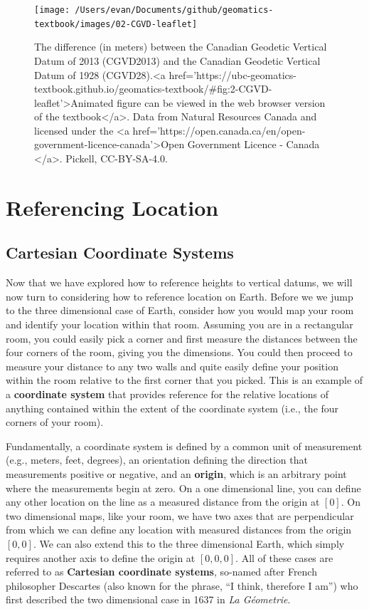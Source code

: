 \documentclass[
]{book}
\begin{document}
\begin{figure}
\texttt{[image: /Users/evan/Documents/github/geomatics-textbook/images/02-CGVD-leaflet]} \caption{The difference (in meters) between the Canadian Geodetic Vertical Datum of 2013 (CGVD2013) and the Canadian Geodetic Vertical Datum of 1928 (CGVD28).<a href='https://ubc-geomatics-textbook.github.io/geomatics-textbook/#fig:2-CGVD-leaflet'>Animated figure can be viewed in the web browser version of the textbook</a>. Data from Natural Resources Canada and licensed under the <a href='https://open.canada.ca/en/open-government-licence-canada'>Open Government Licence - Canada </a>. Pickell, CC-BY-SA-4.0.}\label{fig:2-CGVD-leaflet}
\end{figure}

\hypertarget{referencing-location}{%
\section{Referencing Location}\label{referencing-location}}

\hypertarget{cartesian-coordinate-systems}{%
\subsection{Cartesian Coordinate Systems}\label{cartesian-coordinate-systems}}

Now that we have explored how to reference heights to vertical datums, we will now turn to considering how to reference location on Earth. Before we we jump to the three dimensional case of Earth, consider how you would map your room and identify your location within that room. Assuming you are in a rectangular room, you could easily pick a corner and first measure the distances between the four corners of the room, giving you the dimensions. You could then proceed to measure your distance to any two walls and quite easily define your position within the room relative to the first corner that you picked. This is an example of a \textbf{coordinate system} that provides reference for the relative locations of anything contained within the extent of the coordinate system (i.e., the four corners of your room).

Fundamentally, a coordinate system is defined by a common unit of measurement (e.g., meters, feet, degrees), an orientation defining the direction that measurements positive or negative, and an \textbf{origin}, which is an arbitrary point where the measurements begin at zero. On a one dimensional line, you can define any other location on the line as a measured distance from the origin at \([0]\). On two dimensional maps, like your room, we have two axes that are perpendicular from which we can define any location with measured distances from the origin \([0,0]\). We can also extend this to the three dimensional Earth, which simply requires another axis to define the origin at \([0,0,0]\). All of these cases are referred to as \textbf{Cartesian coordinate systems}, so-named after French philosopher Descartes (also known for the phrase, ``I think, therefore I am'') who first described the two dimensional case in 1637 in \emph{La Géometrie}.
\end{document}
